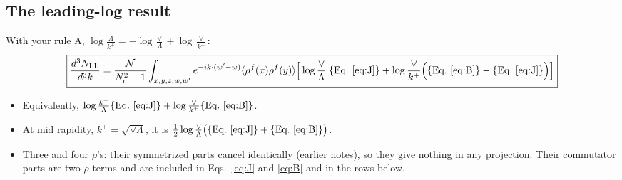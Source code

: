 \documentclass[10pt]{article}
\numberwithin{equation}{section}
\newcommand{\NN}{\mathcal N}
\begin{document}
\subsection{The leading-log result}
With your rule A, $\log\frac{\Lambda}{k^+}=-\log\frac\vee\Lambda+\log\frac{\vee}{k^+}$:
\begin{equation}
\boxed{\frac{d^3N_{\rm LL}}{d^3k}=\frac{\NN}{N_c^2-1}\int_{x,y,z,w,w'}e^{-ik\cdot(w'-w)}\langle\rho^f(x)\rho^f(y)\rangle\Big[\log\frac{\vee}{\Lambda}\;\{\text{Eq.~\eqref{eq:J}}\}+\log\frac{\vee}{k^+}\Big(\{\text{Eq.~\eqref{eq:B}}\}-\{\text{Eq.~\eqref{eq:J}}\}\Big)\Big]}
\label{eq:LL}
\end{equation}
\begin{itemize}
\item Equivalently, $\log\frac{k^+}{\Lambda}\{\text{Eq.~\eqref{eq:J}}\}+\log\frac{\vee}{k^+}\{\text{Eq.~\eqref{eq:B}}\}$.
\item At mid rapidity, $k^+=\sqrt{\vee\Lambda}$, it is $\frac12\log\frac{\vee}{\Lambda}\big(\{\text{Eq.~\eqref{eq:J}}\}+\{\text{Eq.~\eqref{eq:B}}\}\big)$.
\item Three and four $\rho$'s: their symmetrized parts cancel identically (earlier notes), so they give nothing in any projection. Their commutator parts are two-$\rho$ terms and are included in Eqs.~\eqref{eq:J} and \eqref{eq:B} and in the rows below.
\end{itemize}
\end{document}
